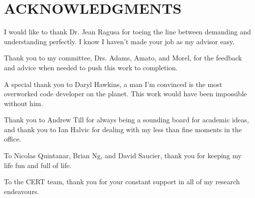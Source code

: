 %
%
%
%


\chapter*{ACKNOWLEDGMENTS}


\indent I would like to thank Dr. Jean Ragusa for toeing the line between demanding and understanding perfectly. I know I haven't made your job as my advisor easy. 

Thank you to my committee, Drs. Adams, Amato, and Morel, for the feedback and advice when needed to push this work to completion.

A special thank you to Daryl Hawkins, a man I'm convinced is the most overworked code developer on the planet. This work would have been impossible without him. 

Thank you to Andrew Till for always being a sounding board for academic ideas, and thank you to Ian Halvic for dealing with my less than fine moments in the office.

To Nicolas Quintanar, Brian Ng, and David Saucier, thank you for keeping my life fun and full of life. 

To the CERT team, thank you for your constant support in all of my research endeavours.




\pagebreak{}
